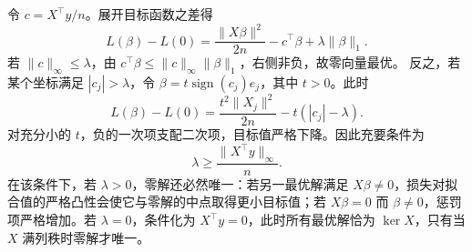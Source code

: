 令 $c=X^\top y/n$。展开目标函数之差得
\[
 L(\beta)-L(0)
 =\frac{\|X\beta\|^2}{2n}-c^\top\beta
   +\lambda\|\beta\|_1.
\]
若 $\|c\|_\infty\le\lambda$，由 $c^\top\beta\le\|c\|_\infty\|\beta\|_1$，右侧非负，故零向量最优。
反之，若某个坐标满足 $|c_j|>\lambda$，令 $\beta=t\operatorname{sign}(c_j)e_j$，其中 $t>0$。此时
\[
 L(\beta)-L(0)
 =\frac{t^2\|X_j\|^2}{2n}-t(|c_j|-\lambda).
\]
对充分小的 $t$，负的一次项支配二次项，目标值严格下降。因此充要条件为
\[
 \boxed{\lambda\ge\frac{\|X^\top y\|_\infty}{n}}.
\]
在该条件下，若 $\lambda>0$，零解还必然唯一：若另一最优解满足 $X\beta\ne0$，损失对拟合值的严格凸性会使它与零解的中点取得更小目标值；若 $X\beta=0$ 而 $\beta\ne0$，惩罚项严格增加。若 $\lambda=0$，条件化为 $X^\top y=0$，此时所有最优解恰为 $\ker X$，只有当 $X$ 满列秩时零解才唯一。
